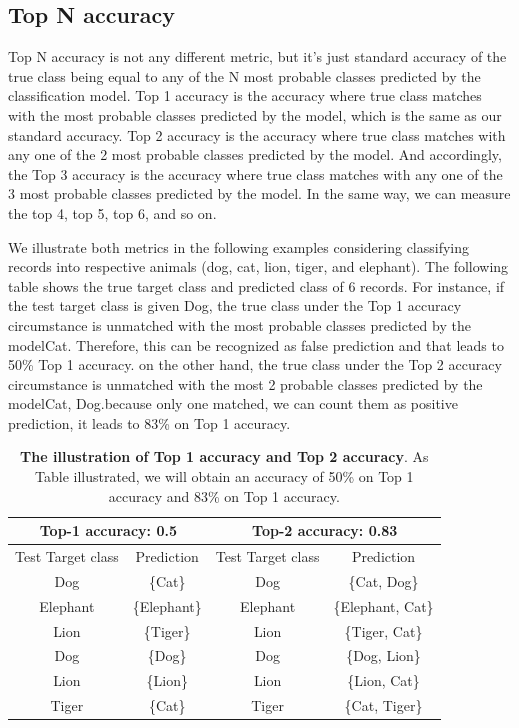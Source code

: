 \subsection{Top N accuracy }
Top N accuracy is not any different metric, but it’s just standard accuracy of the true class being equal to any of the N most probable classes predicted by the classification model.
Top 1 accuracy is the accuracy where true class matches with the most probable classes predicted by the model, which is the same as our standard accuracy. Top 2 accuracy is the accuracy where true class matches with any one of the 2 most probable classes predicted by the model. And accordingly, the Top 3 accuracy is the accuracy where true class matches with any one of the 3 most probable classes predicted by the model. In the same way, we can measure the top 4, top 5, top 6, and so on.


We illustrate both metrics in the following examples considering  classifying records into respective animals (dog, cat, lion, tiger, and elephant). The following table shows the true target class and predicted class of 6 records.
For instance, if the test target class is given Dog, the true class under the Top 1 accuracy circumstance is unmatched with the most probable classes predicted by the model{Cat}. Therefore, this can be recognized as false prediction and that leads to 50\% Top 1 accuracy.
on the other hand, the true class under the Top 2 accuracy circumstance is unmatched with the most 2 probable classes predicted by the model{Cat, Dog}.because only one matched, we can count them as positive prediction, it leads to 83\% on Top  1  accuracy.
\begin{table}[h]
\centering

\begin{tabular}{@{}cccc@{}}

\toprule
\multicolumn{2}{c}{Top-1 accuracy: 0.5} & \multicolumn{2}{c}{Top-2 accuracy: 0.83} \\ \midrule
Test Target class    & Prediction      & Test Target class   & Prediction         \\
Dog                  & \{Cat\}         & Dog                 & \{Cat, Dog\}       \\
Elephant             & \{Elephant\}    & Elephant            & \{Elephant, Cat\}  \\
Lion                 & \{Tiger\}       & Lion                & \{Tiger, Cat\}     \\
Dog                  & \{Dog\}         & Dog                 & \{Dog, Lion\}      \\
Lion                 & \{Lion\}        & Lion                & \{Lion, Cat\}      \\
Tiger                & \{Cat\}         & Tiger               & \{Cat, Tiger\}     \\ \bottomrule


\end{tabular}

\caption{\textbf{The illustration of Top 1 accuracy and Top 2 accuracy}. As Table illustrated, we will obtain an accuracy of 50\% on Top 1 accuracy and 83\% on Top 1 accuracy. }
\end{table}


